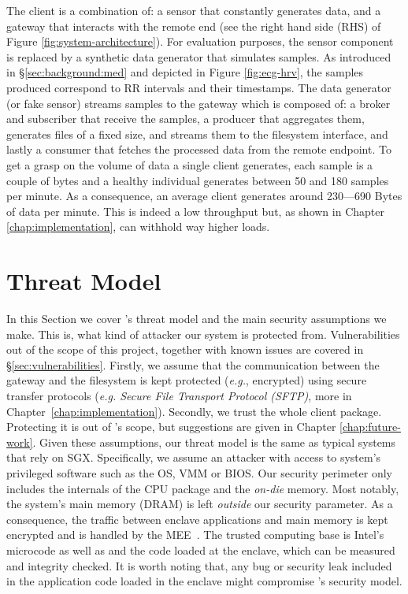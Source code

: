 The client is a combination of: a sensor that constantly generates data, and a gateway that interacts with the remote end (see the right hand side (RHS) of Figure \ref{fig:system-architecture}). 
For evaluation purposes, the sensor component is replaced by a synthetic data generator that simulates samples.
As introduced in \S\ref{sec:background:med} and depicted in Figure \ref{fig:ecg-hrv}, the samples produced correspond to RR intervals and their timestamps.
The data generator (or fake sensor) streams samples to the gateway which is composed of: a broker and subscriber that receive the samples, a producer that aggregates them, generates files of a fixed size, and streams them to the filesystem interface, and lastly a consumer that fetches the processed data from the remote endpoint. 
To get a grasp on the volume of data a single client generates, each sample is a couple of bytes and a healthy individual generates between 50 and 180 samples per minute.
As a consequence, an average client generates around 230---690 Bytes of data per minute.
This is indeed a low throughput but, as shown in Chapter \ref{chap:implementation}, \projName can withhold way higher loads.

\section{Threat Model} \label{sec:threat}

In this Section we cover \projName's threat model and the main security assumptions we make.
This is, what kind of attacker our system is protected from.
Vulnerabilities out of the scope of this project, together with known issues are covered in \S\ref{sec:vulnerabilities}.
Firstly, we assume that the communication between the gateway and the filesystem is kept protected (\emph{e.g.}, encrypted) using secure transfer protocols (\textit{e.g. Secure File Transport Protocol (SFTP)}, more in Chapter~\ref{chap:implementation}).
Secondly, we trust the whole client package.
Protecting it is out of \projName's scope, but suggestions are given in Chapter \ref{chap:future-work}.
Given these assumptions, our threat model is the same as typical systems that rely on \textsc{SGX}. 
Specifically, we assume an attacker with access to system's privileged software such as the OS, VMM or BIOS.
Our security perimeter only includes the internals of the CPU package and the \textit{on-die} memory.
Most notably, the system's main memory (DRAM) is left \emph{outside} our security parameter.
As a consequence, the traffic between enclave applications and main memory is kept encrypted and is handled by the MEE~\cite{Gueron16}.
The trusted computing base is Intel's microcode as well as and the code loaded at the enclave, which can be measured and integrity checked. 
It is worth noting that, any bug or security leak included in the application code loaded in the enclave might compromise \projName's security model.

